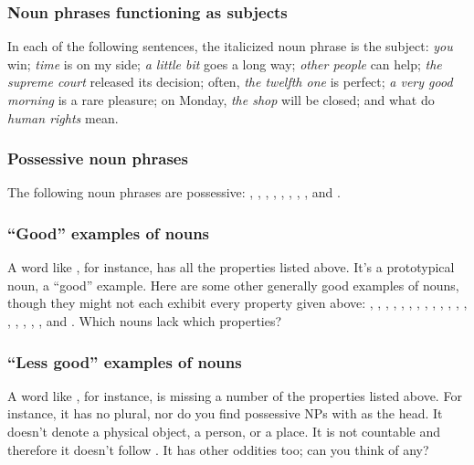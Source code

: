 \subsubsection*{Noun phrases functioning as subjects}
In each of the following sentences, the italicized noun phrase is the subject: \emph{you} win; \emph{time} is on my side; \emph{a little bit} goes a long way; \emph{other people} can help; \emph{the supreme court} released its decision; often, \emph{the twelfth one} is perfect; \emph{a very good morning} is a rare pleasure; on Monday, \emph{the shop} will be closed; and what do \emph{human rights} mean.


\subsubsection*{Possessive noun phrases}
The following noun phrases are possessive: , , , , , , , , and .

\subsubsection*{\enquote{Good} examples of nouns}
A word like , for instance, has all the properties listed above. It's a prototypical noun, a \enquote{good} example. Here are some other generally good examples of nouns, though they might not each exhibit every property given above: , , , , , , , , , , , , , , , , , , and . Which nouns lack which properties?

\subsubsection*{\enquote{Less good} examples of nouns}
A word like , for instance, is missing a number of the properties listed above. For instance, it has no plural, nor do you find possessive NPs with  as the head. It doesn't denote a physical object, a person, or a place. It is not countable and therefore it doesn't follow . It has other oddities too; can you think of any?

